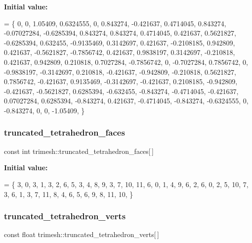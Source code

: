 {\bfseries Initial value\+:}
\begin{DoxyCode}
= \{
    0, 0, 1.05409,
    0.6324555, 0, 0.843274,
    -0.421637, 0.4714045, 0.843274,
    -0.07027284, -0.6285394, 0.843274,
    0.843274, 0.4714045, 0.421637,
    0.5621827, -0.6285394, 0.632455,
    -0.9135469, 0.3142697, 0.421637,
    -0.2108185, 0.942809, 0.421637,
    -0.5621827, -0.7856742, 0.421637,
    0.9838197, 0.3142697, -0.210818,
    0.421637, 0.942809, 0.210818,
    0.7027284, -0.7856742, 0,
    -0.7027284, 0.7856742, 0,
    -0.9838197, -0.3142697, 0.210818,
    -0.421637, -0.942809, -0.210818,
    0.5621827, 0.7856742, -0.421637,
    0.9135469, -0.3142697, -0.421637,
    0.2108185, -0.942809, -0.421637,
    -0.5621827, 0.6285394, -0.632455,
    -0.843274, -0.4714045, -0.421637,
    0.07027284, 0.6285394, -0.843274,
    0.421637, -0.4714045, -0.843274,
    -0.6324555, 0, -0.843274,
    0, 0, -1.05409,
\}
\end{DoxyCode}
\mbox{\label{namespacetrimesh_a522f5731027b1a8c2f56b1c29db46f3f}} 
\subsubsection{\texorpdfstring{truncated\+\_\+tetrahedron\+\_\+faces}{truncated\_tetrahedron\_faces}}
{\footnotesize\ttfamily const int trimesh\+::truncated\+\_\+tetrahedron\+\_\+faces\mbox{[}$\,$\mbox{]}\hspace{0.3cm}{\ttfamily [static]}}

{\bfseries Initial value\+:}
\begin{DoxyCode}
= \{
    3, 0, 3, 1,
    3, 2, 6, 5,
    3, 4, 8, 9,
    3, 7, 10, 11,
    6, 0, 1, 4, 9, 6, 2,
    6, 0, 2, 5, 10, 7, 3,
    6, 1, 3, 7, 11, 8, 4,
    6, 5, 6, 9, 8, 11, 10,
\}
\end{DoxyCode}
\mbox{\label{namespacetrimesh_a5a92f5a7d9dd3387cda735710f51bea2}} 
\subsubsection{\texorpdfstring{truncated\+\_\+tetrahedron\+\_\+verts}{truncated\_tetrahedron\_verts}}
{\footnotesize\ttfamily const float trimesh\+::truncated\+\_\+tetrahedron\+\_\+verts\mbox{[}$\,$\mbox{]}\hspace{0.3cm}{\ttfamily [static]}}

